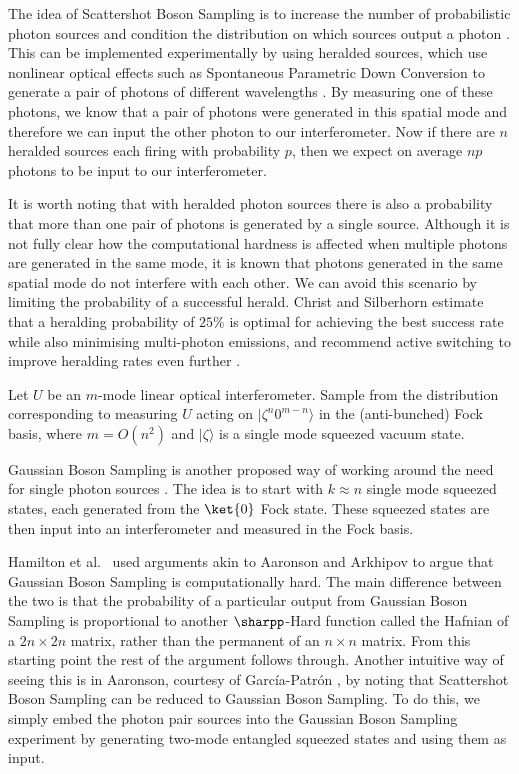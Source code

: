 The idea of Scattershot Boson Sampling is to increase the number of probabilistic photon sources and condition the distribution on which sources output a photon \cite{aaronson2013, lund2014}. This can be implemented experimentally by using heralded sources, which use nonlinear optical effects such as Spontaneous Parametric Down Conversion to generate a pair of photons of different wavelengths \cite{loudon2006}. By measuring one of these photons, we know that a pair of photons were generated in this spatial mode and therefore we can input the other photon to our interferometer. Now if there are $n$ heralded sources each firing with probability $p$, then we expect on average $np$ photons to be input to our interferometer.

It is worth noting that with heralded photon sources there is also a probability that more than one pair of photons is generated by a single source. Although it is not fully clear how the computational hardness is affected when multiple photons are generated in the same mode, it is known that photons generated in the same spatial mode do not interfere with each other. We can avoid this scenario by limiting the probability of a successful herald. Christ and Silberhorn estimate that a heralding probability of $25\%$ is optimal for achieving the best success rate while also minimising multi-photon emissions, and recommend active switching to improve heralding rates even further \cite{christ2012}.

\begin{problem} Let $U$ be an $m$-mode linear optical interferometer. Sample from the distribution corresponding to measuring $U$ acting on $|\zeta^n0^{m-n}\rangle$ in the (anti-bunched) Fock basis, where $m=O(n^2)$ and $|\zeta\rangle$ is a single mode squeezed vacuum state.
\end{problem}

Gaussian Boson Sampling is another proposed way of working around the need for single photon sources \cite{hamilton2017}. The idea is to start with $k\approx n$ single mode squeezed states, each generated from the $\ket{0}$ Fock state. These squeezed states are then input into an interferometer and measured in the Fock basis.

Hamilton et al.~\cite{hamilton2017} used arguments akin to Aaronson and Arkhipov to argue that Gaussian Boson Sampling is computationally hard. The main difference between the two is that the probability of a particular output from Gaussian Boson Sampling is proportional to another $\sharpp$-Hard function called the Hafnian of a $2n\times 2n$ matrix, rather than the permanent of an $n\times n$ matrix. From this starting point the rest of the argument follows through. Another intuitive way of seeing this is in Aaronson, courtesy of Garc\'{i}a-Patr\'{o}n \cite{aaronson2013}, by noting that Scattershot Boson Sampling can be reduced to Gaussian Boson Sampling. To do this, we simply embed the photon pair sources into the Gaussian Boson Sampling experiment by generating two-mode entangled squeezed states and using them as input.


